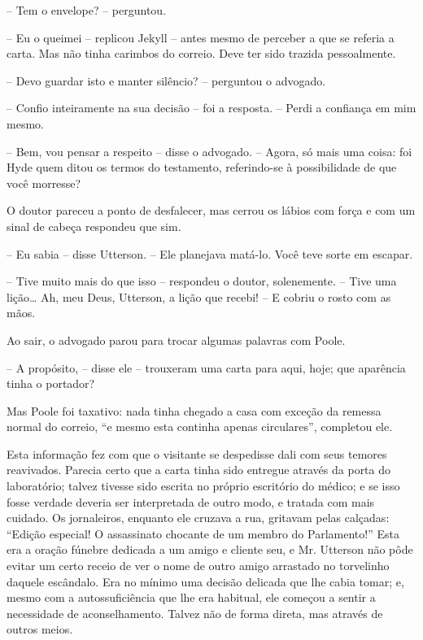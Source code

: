 -- Tem o envelope? -- perguntou.

-- Eu o queimei -- replicou Jekyll -- antes  mesmo de perceber a que se
referia a carta.  Mas não tinha carimbos do correio.  Deve ter sido
trazida pessoalmente.

-- Devo guardar isto e manter silêncio? -- perguntou o advogado.

-- Confio inteiramente na sua decisão -- foi a resposta. -- Perdi a
confiança em mim mesmo.

-- Bem, vou pensar a respeito -- disse o advogado. -- Agora, só mais uma
coisa: foi Hyde quem ditou os termos do testamento, referindo-se à
possibilidade de que você morresse?

O doutor pareceu a ponto de desfalecer, mas cerrou os lábios com força e
com um sinal de cabeça respondeu que sim.

-- Eu sabia -- disse Utterson. -- Ele planejava matá-lo.  Você teve sorte
em escapar. 

-- Tive muito mais do que isso -- respondeu o doutor, solenemente. --
Tive uma lição\ldots{}  Ah, meu Deus, Utterson, a lição que recebi!  --  E
cobriu o rosto com as mãos.

Ao sair, o advogado parou para trocar algumas palavras com Poole.

-- A propósito, -- disse ele -- trouxeram uma carta para aqui, hoje; que
aparência tinha o portador?

Mas Poole foi taxativo: nada tinha chegado a casa com exceção da remessa
normal do correio, “e mesmo esta continha apenas circulares”, completou
ele.

Esta informação fez com que o visitante se despedisse dali com seus
temores reavivados.  Parecia certo que a carta tinha sido entregue
através da porta do laboratório; talvez tivesse sido escrita no próprio
escritório do médico; e se isso fosse verdade deveria ser interpretada
de outro modo, e tratada com mais cuidado.  Os jornaleiros, enquanto
ele cruzava a rua, gritavam pelas calçadas: “Edição especial!  O
assassinato chocante de um membro do Parlamento!”  Esta era a oração
fúnebre dedicada a um amigo e cliente seu, e Mr. Utterson não pôde
evitar um certo receio de ver o nome de outro amigo arrastado no
torvelinho daquele escândalo.  Era no mínimo uma decisão delicada que
lhe cabia tomar; e, mesmo com a autossuficiência que lhe era habitual,
ele começou a sentir a necessidade de aconselhamento.  Talvez não de
forma direta, mas através de outros meios.

